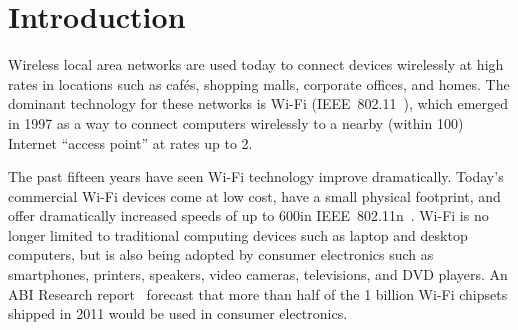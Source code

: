 \ifx\mainfile\undefined

\setcounter{chapter}{0} %
\fi

\cleardoublepage
\chapter{Introduction}
\label{chap:intro}


Wireless local area networks are used today to connect devices wirelessly at high rates in locations such as caf\'{e}s, shopping malls, corporate offices, and homes. The dominant technology for these networks is Wi-Fi (IEEE~802.11~\cite{80211}), which emerged in 1997 as a way to connect computers wirelessly to a nearby (within 100\m) Internet ``access point'' at rates up to 2\Mbps.

The past fifteen years have seen Wi-Fi technology improve dramatically. Today's commercial Wi-Fi devices come at low cost, have a small physical footprint, and offer dramatically increased speeds of up to 600\Mbps in IEEE~802.11n~\cite{80211n}. Wi-Fi is no longer limited to traditional computing devices such as laptop and desktop computers, but is also being adopted by consumer electronics such as smartphones, printers, speakers, video cameras, televisions, and DVD players. An ABI Research report~\cite{ABI_Research_2010} forecast that more than half of the 1 billion Wi-Fi chipsets shipped in 2011 would be used in consumer electronics.

